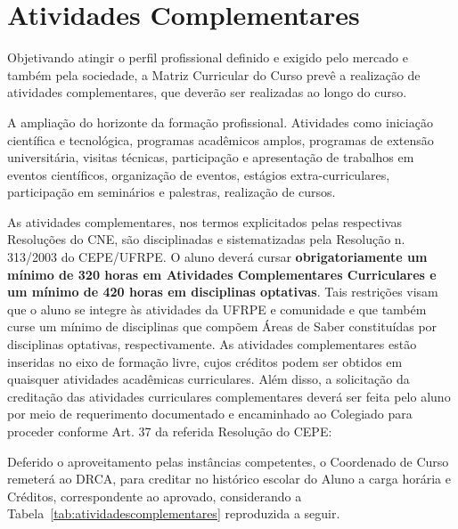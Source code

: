 \documentclass[
	12pt,				%
	openright,			%
  oneside,     %
	a4paper,			%
	english,			%
	french,				%
	spanish,			%
	brazil				%
	]{abntex2}
\begin{document}
\section{Atividades Complementares}

Objetivando atingir o perfil profissional definido e exigido pelo mercado e
também pela sociedade, a Matriz Curricular do Curso prevê a realização de
atividades complementares, que deverão ser realizadas ao longo do curso. 

A ampliação do horizonte da formação profissional. Atividades como iniciação
científica e tecnológica, programas acadêmicos amplos, programas de extensão
universitária, visitas técnicas, participação e apresentação de trabalhos em
eventos científicos, organização de eventos, estágios extra-curriculares,
participação em seminários e palestras, realização de cursos.

As atividades complementares,  nos termos explicitados pelas respectivas
Resoluções do CNE, são disciplinadas  e sistematizadas pela Resolução n.
313/2003 do CEPE/UFRPE. O aluno deverá cursar  \textbf{obrigatoriamente um
mínimo de 320 horas em Atividades Complementares Curriculares e um mínimo de 420 horas em
disciplinas optativas}. Tais restrições visam que o aluno se integre  às atividades da UFRPE e comunidade e
que também curse um mínimo de disciplinas  que compõem Áreas de Saber
constituídas por disciplinas optativas,  respectivamente. As atividades
complementares estão inseridas no eixo de  formação livre, cujos créditos podem
ser obtidos em quaisquer atividades acadêmicas  curriculares. Além disso, a
solicitação da creditação das atividades curriculares  complementares deverá ser
feita pelo aluno por meio de requerimento documentado e  encaminhado ao
Colegiado para proceder conforme Art. 37 da referida  Resolução do CEPE:

Deferido o aproveitamento pelas instâncias competentes,  o Coordenado de Curso
remeterá ao DRCA, para creditar no histórico escolar do  Aluno a carga horária e
Créditos, correspondente ao aprovado, considerando a Tabela~\ref{tab:atividadescomplementares} reproduzida a seguir.
\end{document}
